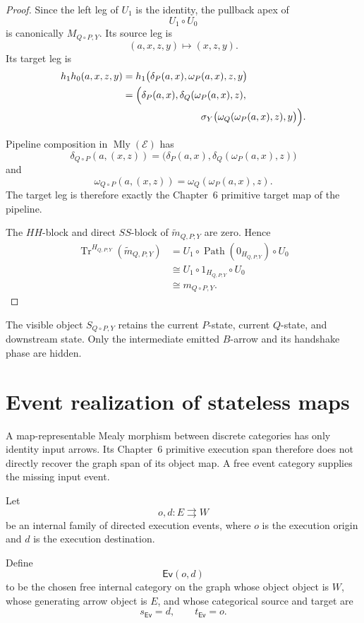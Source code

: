 \begin{proof}
Since the left leg of \(U_1\) is the identity, the pullback apex of
\[
  U_1\circ U_0
\]
is canonically \(M_{Q\circ P,Y}\). Its source leg is
\[
  (a,x,z,y)\longmapsto(x,z,y).
\]
Its target leg is
\[
\begin{aligned}
  h_1h_0(a,x,z,y)
  &=
  h_1
  \bigl(
    \delta_P(a,x),
    \omega_P(a,x),
    z,
    y
  \bigr)
  \\
  &=
  \Bigl(
    \delta_P(a,x),
    \delta_Q(\omega_P(a,x),z),
    \\
    &\hspace{28mm}
    \sigma_Y
    \bigl(
      \omega_Q(\omega_P(a,x),z),
      y
    \bigr)
  \Bigr).
\end{aligned}
\]

Pipeline composition in \(\operatorname{Mly}(\mathcal E)\) has
\[
  \delta_{Q\circ P}(a,(x,z))
  =
  \bigl(
    \delta_P(a,x),
    \delta_Q(\omega_P(a,x),z)
  \bigr)
\]
and
\[
  \omega_{Q\circ P}(a,(x,z))
  =
  \omega_Q(\omega_P(a,x),z).
\]
The target leg is therefore exactly the Chapter~6 primitive target map of the pipeline.

The \(HH\)-block and direct \(SS\)-block of \(\widetilde m_{Q,P;Y}\) are zero. Hence
\[
\begin{aligned}
  \operatorname{Tr}^{H_{Q,P;Y}}
  (\widetilde m_{Q,P;Y})
  &=
  U_1
  \circ
  \operatorname{Path}(0_{H_{Q,P;Y}})
  \circ
  U_0
  \\
  &\cong
  U_1\circ1_{H_{Q,P;Y}}\circ U_0
  \\
  &\cong
  m_{Q\circ P,Y}.
\end{aligned}
\]
\end{proof}

The visible object \(S_{Q\circ P,Y}\) retains the current \(P\)-state, current \(Q\)-state, and
downstream state. Only the intermediate emitted \(B\)-arrow and its handshake phase are hidden.

\section{Event realization of stateless maps}
\label{sec:event-realization}

A map-representable Mealy morphism between discrete categories has only identity input arrows.
Its Chapter~6 primitive execution span therefore does not directly recover the graph span of its
object map. A free event category supplies the missing input event.

\begin{definition}
\label{def:internal-event-category}
Let
\[
  o,d:E\rightrightarrows W
\]
be an internal family of directed execution events, where \(o\) is the execution origin and \(d\) is
the execution destination.

Define
\[
  \mathsf{Ev}(o,d)
\]
to be the chosen free internal category on the graph whose object object is \(W\), whose generating
arrow object is \(E\), and whose categorical source and target are
\[
  s_{\mathsf{Ev}}=d,
  \qquad
  t_{\mathsf{Ev}}=o.
\]
\end{definition}

